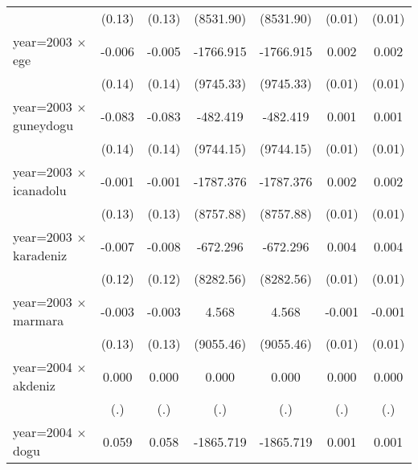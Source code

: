 {\begin{tabular}{l*{6}{c}}
                    &      (0.13)         &      (0.13)         &   (8531.90)         &   (8531.90)         &      (0.01)         &      (0.01)         \\
year=2003 $\times$ ege&      -0.006         &      -0.005         &   -1766.915         &   -1766.915         &       0.002         &       0.002         \\
                    &      (0.14)         &      (0.14)         &   (9745.33)         &   (9745.33)         &      (0.01)         &      (0.01)         \\
year=2003 $\times$ guneydogu&      -0.083         &      -0.083         &    -482.419         &    -482.419         &       0.001         &       0.001         \\
                    &      (0.14)         &      (0.14)         &   (9744.15)         &   (9744.15)         &      (0.01)         &      (0.01)         \\
year=2003 $\times$ icanadolu&      -0.001         &      -0.001         &   -1787.376         &   -1787.376         &       0.002         &       0.002         \\
                    &      (0.13)         &      (0.13)         &   (8757.88)         &   (8757.88)         &      (0.01)         &      (0.01)         \\
year=2003 $\times$ karadeniz&      -0.007         &      -0.008         &    -672.296         &    -672.296         &       0.004         &       0.004         \\
                    &      (0.12)         &      (0.12)         &   (8282.56)         &   (8282.56)         &      (0.01)         &      (0.01)         \\
year=2003 $\times$ marmara&      -0.003         &      -0.003         &       4.568         &       4.568         &      -0.001         &      -0.001         \\
                    &      (0.13)         &      (0.13)         &   (9055.46)         &   (9055.46)         &      (0.01)         &      (0.01)         \\
year=2004 $\times$ akdeniz&       0.000         &       0.000         &       0.000         &       0.000         &       0.000         &       0.000         \\
                    &         (.)         &         (.)         &         (.)         &         (.)         &         (.)         &         (.)         \\
year=2004 $\times$ dogu&       0.059         &       0.058         &   -1865.719         &   -1865.719         &       0.001         &       0.001         \\

\end{tabular}}
